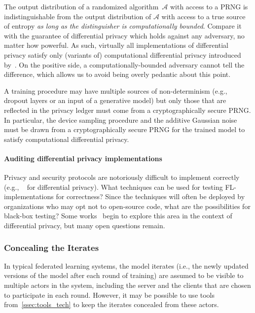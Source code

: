 The output distribution of a randomized algorithm~$\mathcal{A}$ with access to a PRNG is indistinguishable from the output distribution of $\mathcal{A}$ with access to a true source of entropy \emph{as long as the distinguisher is computationally bounded}. Compare it with the guarantee of differential privacy which holds against any adversary, no matter how powerful. As such, virtually all implementations of differential privacy satisfy only (variants of) computational differential privacy introduced by~\citep{Mironov-CDP}. On the positive side, a computationally-bounded adversary cannot tell the difference, which allows us to avoid being overly pedantic about this point.

A training procedure may have multiple sources of non-determinism (e.g., dropout layers or an input of a generative model) but only those that are reflected in the privacy ledger must come from a cryptographically secure PRNG. In particular, the device sampling procedure and the additive Gaussian noise must be drawn from a cryptographically secure PRNG for the trained model to satisfy computational differential privacy. 

\paragraph{Auditing differential privacy implementations}
Privacy and security protocols are notoriously difficult to implement correctly (e.g., ~\cite{mironov2012significance, haeberlen2011differential} for differential privacy). What techniques can be used for testing FL-implementations for correctness? Since the techniques will often be deployed by organizations who may opt not to open-source code, what are the possibilities for black-box testing?  Some works~\cite{ding2019detecting,liu2019minimax,jagielski2020auditing} begin to explore this area in the context of differential privacy, but many open questions remain.

\subsubsection{Concealing the Iterates}
\label{sssec:concealing_iterates}

In typical federated learning systems, the model iterates (i.e., the newly updated versions of the model after each round of training) are assumed to be visible to multiple actors in the system, including the server and the clients that are chosen to participate in each round.  However, it may be possible to use tools from~\cref{ssec:tools_tech} to keep the iterates concealed from these actors.

